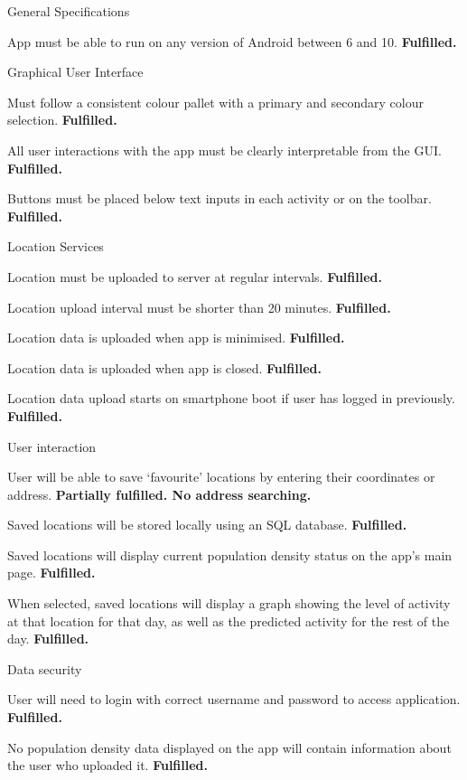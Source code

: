 \begin{SA}
    \item General Specifications
    \begin{SA}
        \item App must be able to run on any version of Android between 6 and 10. \textbf{Fulfilled.}
    \end{SA}
    \item Graphical User Interface 
    \begin{SA}
        \item Must follow a consistent colour pallet with a primary and secondary colour selection. \textbf{Fulfilled.}
        \item All user interactions with the app must be clearly interpretable from the GUI. \textbf{Fulfilled.}
        \item Buttons must be placed below text inputs in each activity or on the toolbar. \textbf{Fulfilled.}
    \end{SA}
    \item Location Services
    \begin{SA}
        \item Location must be uploaded to server at regular intervals. \textbf{Fulfilled.}
        \item Location upload interval must be shorter than 20 minutes. \textbf{Fulfilled.}
        \item Location data is uploaded when app is minimised. \textbf{Fulfilled.}
        \item Location data is uploaded when app is closed. \textbf{Fulfilled.}
        \item Location data upload starts on smartphone boot if user has logged in previously. \textbf{Fulfilled.}
    \end{SA}
    \item User interaction
    \begin{SA}
        \item User will be able to save ‘favourite' locations by entering their coordinates or address. \textbf{Partially fulfilled. No address searching.}
        \item Saved locations will be stored locally using an SQL database. \textbf{Fulfilled.}
        \item Saved locations will display current population density status on the app's main page. \textbf{Fulfilled.}
        \item When selected, saved locations will display a graph showing the level of activity at that location for that day, as well as the predicted activity for the rest of the day. \textbf{Fulfilled.}
    \end{SA}
    \item Data security
    \begin{SA}
        \item User will need to login with correct username and password to access application. \textbf{Fulfilled.}
        \item No population density data displayed on the app will contain information about the user who uploaded it. \textbf{Fulfilled.}
    \end{SA}
\end{SA}

